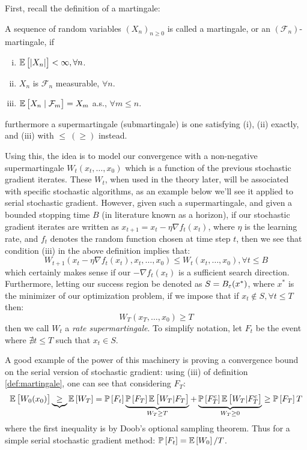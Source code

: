 First, recall the definition of a martingale:
\begin{definition} \label{def:martingale}
  \cite{2004JP} A sequence of random variables $(X_n)_{n \geq 0}$ is called
  a martingale, or an $(\mathcal{F}_n)$-martingale, if
  \begin{enumerate}[(i)]
    \item $\mathbb{E}\left[|X_n|\right] < \infty, \forall n$.
    \item $X_n$ is $\mathcal{F}_n$ measurable, $\forall n$.
    \item $\mathbb{E}\left[X_n \mid \mathcal{F}_m\right] = X_m$ a.s., $\forall m \leq n$.
  \end{enumerate}
  furthermore a supermartingale (submartingale) is one satisfying (i), (ii)
  exactly, and (iii) with $\leq\ (\geq)$ instead.
\end{definition}
Using this, the idea is to model our convergence with a non-negative
supermartingale $W_t(x_t, \dots, x_0)$ which is a function of the previous
stochastic gradient iterates. These $W_t$, when used in the theory later, will
be associated with specific stochastic algorithms, as an example below we'll see
it applied to serial stochastic gradient. However, given such a supermartingale,
and given a bounded stopping time $B$ (in literature known as a horizon), if our
stochastic gradient iterates are written as $x_{t+1} = x_t - \eta \nabla
f_t(x_t)$, where $\eta$ is the learning rate, and $f_t$ denotes the random
function chosen at time step $t$, then we see that condition (iii) in the above
definition implies that:
\[
  W_{t+1}(x_t - \eta \nabla f_t(x_t), x_t, \dots, x_0)
  \leq
  W_t(x_t, \dots, x_0), \forall t \leq B
\]
which certainly makes sense if our $-\nabla f_t(x_t)$ is a sufficient search
direction. Furthermore, letting our success region be denoted as $S
= B_\varepsilon(x^*)$, where $x^*$ is the minimizer of our optimization problem, if we
impose that if $x_t \not\in S, \forall t \leq T$ then:
\[
  W_T(x_T, \dots, x_0) \geq T
\]
then we call $W_t$ a {\it rate supermartingale}. To simplify notation, let $F_t$
be the event where $\nexists t \leq T$ such that $x_t \in S$. 

A good example of the power of this machinery is proving a convergence bound on
the serial version of stochastic gradient: using (iii) of definition
\ref{def:martingale}, one can see that considering $F_T$:
\[
  \mathbb{E}\left[W_0(x_0)\right]
  \underbrace{\geq}
  \mathbb{E}\left[W_T\right]
  =
  \mathbb{P}\left[F_t\right]
  \underbrace{\mathbb{P}\left[F_T\right]\mathbb{E}\left[W_T | F_T\right]}_{W_T \geq T} + 
  \underbrace{\mathbb{P}\left[F_T^c\right]\mathbb{E}\left[W_T | F_T^c\right]}_{W_T \geq 0}
  \geq
  \mathbb{P}\left[F_T\right]T
\]
where the first inequality is by Doob's optional sampling theorem. Thus for
a simple serial stochastic gradient method: $\mathbb{P}\left[F_t\right] = \mathbb{E}\left[W_0\right] / T$.


